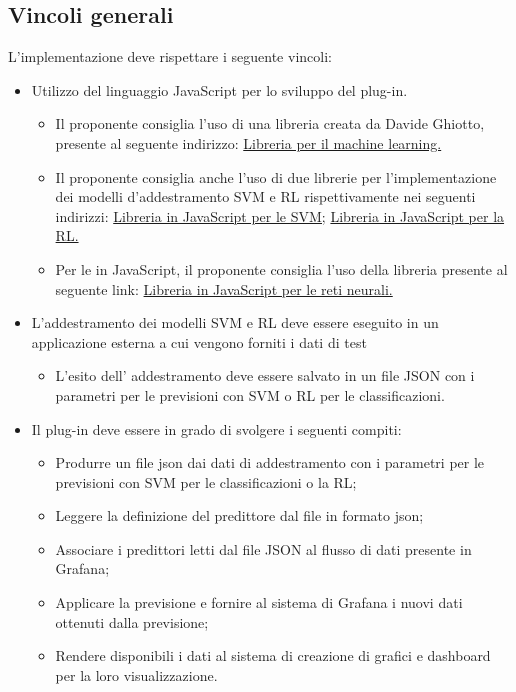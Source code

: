 \documentclass[../analisi-dei-requisiti.tex]{subfiles}
\begin{document}
\subsection{Vincoli generali}
\label{subs:vincoli_generali}
	L'implementazione deve rispettare i seguente vincoli:
	\begin{itemize}
		\item{Utilizzo del linguaggio JavaScript per lo sviluppo del plug-in.}
		\begin{itemize}
			\item{Il proponente consiglia l'uso di una libreria creata da Davide Ghiotto, presente al seguente indirizzo:
			\newline \href{https://www.npmjs.com/package/ml-modules}{Libreria per il machine learning.}}
			\item{Il proponente consiglia anche l'uso di due librerie per l'implementazione dei modelli d'addestramento SVM e RL rispettivamente nei seguenti indirizzi:
			\newline \href{https://github.com/karpathy/svmjs}{Libreria in JavaScript per le SVM;}
			\newline \href{https://github.com/Tom-Alexander/regression-js}{Libreria in JavaScript per la RL.}}
			\item{Per le  in JavaScript, il proponente consiglia l'uso della libreria presente al seguente link:
			\newline \href{https://cd.standford.edu/people/karpathy/convnetis}{Libreria in JavaScript per le reti neurali.}}
		\end{itemize}
		\item{L'addestramento dei modelli SVM e RL deve essere eseguito in un applicazione esterna a cui vengono forniti i dati di test}
		\begin{itemize}
			\item{L'esito dell' addestramento deve essere salvato in un file JSON con i parametri per le previsioni con SVM o RL per le classificazioni.}
		\end{itemize}
	\item{Il plug-in deve essere in grado di svolgere i seguenti compiti:}
		\begin{itemize}
			\item{Produrre un file json dai dati di addestramento con i parametri per le previsioni con SVM per le classificazioni o la RL;}
			\item{Leggere la definizione del predittore dal file in formato json;}
			\item{Associare i predittori letti dal file JSON al flusso di dati presente in Grafana;}
			\item{Applicare la previsione e fornire al sistema di Grafana i nuovi dati ottenuti dalla previsione;}
			\item{Rendere disponibili i dati al sistema di creazione di grafici e dashboard per la loro visualizzazione.}
		\end{itemize}
	\end{itemize}
\end{document}
